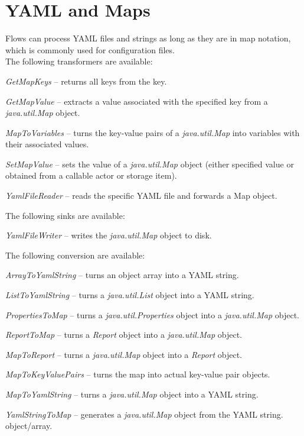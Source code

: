 \newpage
\section{YAML and Maps}
\label{yaml}
Flows can process YAML\cite{yaml} files and strings as long as they are in map notation,
which is commonly used for configuration files. \\
The following transformers are available:
\begin{tight_itemize}
	\item \textit{GetMapKeys} -- returns all keys from the key.
	\item \textit{GetMapValue} -- extracts a value associated with the
	specified key from a \textit{java.util.Map} object.
	\item \textit{MapToVariables} -- turns the key-value pairs of a
	\textit{java.util.Map} into variables with their associated values.
	\item \textit{SetMapValue} -- sets the value of a \textit{java.util.Map}
	object (either specified value or obtained from a callable actor or storage item).
	\item \textit{YamlFileReader} -- reads the specific YAML file and forwards
	a Map object.
\end{tight_itemize}
The following sinks are available:
\begin{tight_itemize}
	\item \textit{YamlFileWriter} -- writes the \textit{java.util.Map}
	object to disk.
\end{tight_itemize}
The following conversion are available:
\begin{tight_itemize}
	\item \textit{ArrayToYamlString} -- turns an object array into a YAML string.
	\item \textit{ListToYamlString} -- turns a \textit{java.util.List} object
	into a YAML string.
	\item \textit{PropertiesToMap} -- turns a \textit{java.util.Properties}
	object into a \textit{java.util.Map} object.
	\item \textit{ReportToMap} -- turns a \textit{Report} object into a
	\textit{java.util.Map} object.
	\item \textit{MapToReport} -- turns a \textit{java.util.Map} object into a
	\textit{Report} object.
	\item \textit{MapToKeyValuePairs} -- turns the map into actual
	key-value pair objects.
	\item \textit{MapToYamlString} -- turns a \textit{java.util.Map} object
	into a YAML string.
	\item \textit{YamlStringToMap} -- generates a \textit{java.util.Map}
	object from the YAML string.
	object/array.
\end{tight_itemize}


